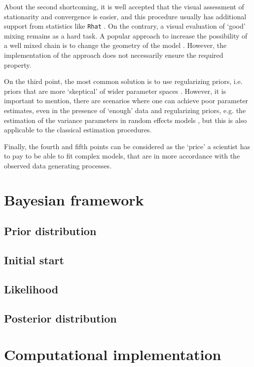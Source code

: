 About the second shortcoming, it is well accepted that the visual assessment of stationarity and convergence is easier, and this procedure usually has additional support from statistics like \texttt{Rhat} \cite{Gelman_et_al_2014}. On the contrary, a visual evaluation of `good' mixing remains as a hard task. A popular approach to increase the possibility of a well mixed chain is to change the geometry of the model \cite{McElreath_2020}. However, the implementation of the approach does not necessarily ensure the required property.

On the third point, the most common solution is to use regularizing priors, i.e. priors that are more `skeptical' of wider parameter spaces \cite{McElreath_2020}. However, it is important to mention, there are scenarios where one can achieve poor parameter estimates, even in the presence of `enough' data and regularizing priors, e.g. the estimation of the variance parameters in random effects models \cite{Skrondal_et_al_2004a}, but this is also applicable to the classical estimation procedures.

Finally, the fourth and fifth points can be considered as the `price' a scientist has to pay to be able to fit complex models, that are in more accordance with the observed data generating processes.


\section{Bayesian framework}

\subsection{Prior distribution}

\subsection{Initial start}

\subsection{Likelihood}

\subsection{Posterior distribution}


\section{Computational implementation} \label{sect:comp_imp}

